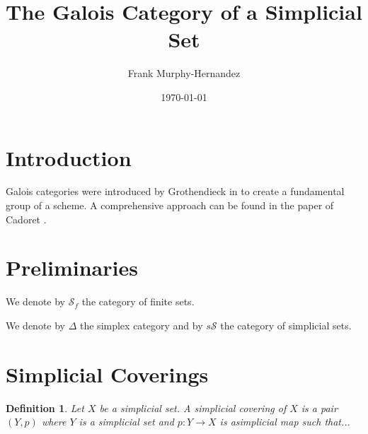\documentclass{amsart}
\newtheorem{definition}{Definition}[section]
\begin{document}
\title{The Galois Category of a Simplicial Set}

\author{Frank Murphy-Hernandez}
\address{Facultad de Ciencias, UNAM, Mexico City}


\date{\today}


\begin{abstract}

\end{abstract}

\maketitle

\section*{Introduction}


Galois categories were introduced by Grothendieck in \cite{grothendieck1971revetement} to create a fundamental group of a scheme. A comprehensive approach can be found in the paper of Cadoret \cite{cadoret2013galois}.



\section{Preliminaries}

We denote by $\mathcal{S}_f$ the category of finite sets.

We denote by $\Delta$ the simplex category and by $s\mathcal{S}$ the category of simplicial sets.

\cite{goerss2009simplicial}
\cite{may1992simplicial}


\section{Simplicial Coverings}

\begin{definition}
Let $X$ be a simplicial set. A simplicial covering of $X$ is a pair $(Y,p)$ where $Y$ is a simplicial set and $p\colon Y\longrightarrow X$ is asimplicial map such that...
\end{definition}
\end{document}
